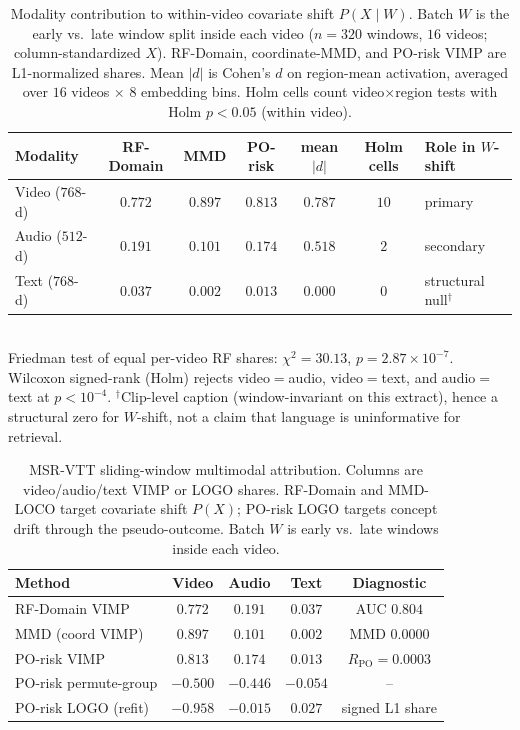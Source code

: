 
\begin{table}[ht]\centering
\caption{Modality contribution to within-video covariate shift $P(X\mid W)$.
Batch $W$ is the early vs.\ late window split inside each video ($n=320$ windows, $16$ videos; column-standardized $X$).
RF-Domain, coordinate-MMD, and PO-risk VIMP are L1-normalized shares.
Mean $|d|$ is Cohen's $d$ on region-mean activation, averaged over $16$ videos $\times$ $8$ embedding bins.
Holm cells count video$\times$region tests with Holm $p<0.05$ (within video).}
\label{tab:msrvtt-mm-shift-contrib}
\small
\begin{tabular}{@{}l ccc cc l@{}}\toprule
Modality & RF-Domain & MMD & PO-risk & mean $|d|$ & Holm cells & Role in $W$-shift \\
\midrule
Video ($768$-d) & $0.772$ & $0.897$ & $0.813$ & $0.787$ & $10$ & primary \\
Audio ($512$-d) & $0.191$ & $0.101$ & $0.174$ & $0.518$ & $2$  & secondary \\
Text ($768$-d)  & $0.037$ & $0.002$ & $0.013$ & $0.000$ & $0$  & structural null$^{\dagger}$ \\
\bottomrule\end{tabular}\\[0.45em]
{\footnotesize
Friedman test of equal per-video RF shares: $\chi^{2}=30.13$, $p=2.87\times 10^{-7}$.
Wilcoxon signed-rank (Holm) rejects video$=$audio, video$=$text, and audio$=$text at $p<10^{-4}$.
$^{\dagger}$Clip-level caption (window-invariant on this extract), hence a structural zero for $W$-shift, not a claim that language is uninformative for retrieval.
}
\end{table}

\begin{table}[ht]\centering
\caption{MSR-VTT sliding-window multimodal attribution. Columns are video/audio/text VIMP or LOGO shares. RF-Domain and MMD-LOCO target covariate shift $P(X)$; PO-risk LOGO targets concept drift through the pseudo-outcome. Batch $W$ is early vs.\ late windows inside each video.}
\label{tab:msrvtt-mm-shares}
\small
\begin{tabular}{@{}l ccc c@{}}\toprule
Method & Video & Audio & Text & Diagnostic \\
\midrule
RF-Domain VIMP & $0.772$ & $0.191$ & $0.037$ & AUC $0.804$ \\
MMD (coord VIMP) & $0.897$ & $0.101$ & $0.002$ & MMD $0.0000$ \\
PO-risk VIMP & $0.813$ & $0.174$ & $0.013$ & $R_{\mathrm{PO}}=0.0003$ \\
PO-risk permute-group & $-0.500$ & $-0.446$ & $-0.054$ & -- \\
PO-risk LOGO (refit) & $-0.958$ & $-0.015$ & $0.027$ & signed L1 share \\
\bottomrule\end{tabular}\end{table}

